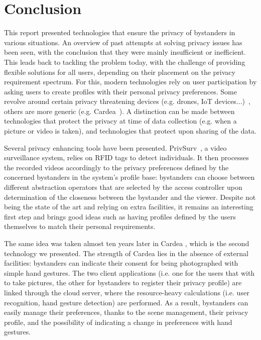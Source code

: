 \documentclass[conference, 11pt]{IEEEtran}
\begin{document}
\section{Conclusion}\label{Conclusion}
This report presented technologies that ensure the privacy of bystanders in various situations. An overview of past attempts at solving privacy issues has been seen, with the conclusion that they were mainly insufficient or inefficient. This leads back to tackling the problem today, with the challenge of providing flexible solutions for all users, depending on their placement on the privacy requirement spectrum. For this, modern technologies rely on user participation by asking users to create profiles with their personal privacy preferences. Some revolve around certain privacy threatening devices (e.g. drones, \ac{IoT} devices...)~\cite{yao2017privacy, bernd2020bystanders}, others are more generic (e.g. Cardea~\cite{shu2016cardea}). A distinction can be made between technologies that protect the privacy at time of data collection (e.g. when a picture or video is taken), and technologies that protect upon sharing of the data.

Several privacy enhancing tools have been presented. PrivSurv~\cite{chinomi2008PriSurv}, a video surveillance system, relies on  \ac{RFID} tags to detect individuals. It then processes the recorded videos accordingly to the privacy preferences defined by the concerned bystanders in the system's profile base: bystanders can choose between different abstraction operators that are selected by the access controller upon determination of the closeness between the bystander and the viewer. Despite not being the state of the art and relying on extra facilities, it remains an interesting first step and brings good ideas such as having profiles defined by the users themselves to match their personal requirements. 

The same idea was taken almost ten years later in Cardea \cite{shu2016cardea}, which is the second technology we presented. The strength of Cardea lies in the absence of external facilities: bystanders can indicate their consent for being photographed with simple hand gestures. The two client applications (i.e. one for the users that with to take pictures, the other for bystanders to register their privacy profile) are linked through the cloud server, where the resource-heavy calculations (i.e. user recognition, hand gesture detection) are performed. As a result, bystanders can easily manage their preferences, thanks to the scene management, their privacy profile, and the possibility of indicating a change in preferences with hand gestures. 
\end{document}
